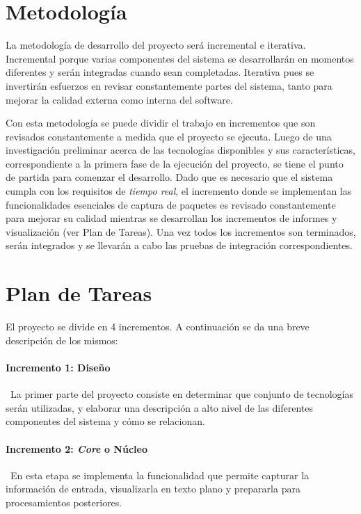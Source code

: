 \section*{Metodología}

La metodología de desarrollo del proyecto será incremental e iterativa. Incremental porque varias componentes del sistema se desarrollarán en momentos diferentes y serán integradas cuando sean completadas. Iterativa pues se invertirán esfuerzos en revisar constantemente partes del sistema, tanto para mejorar la calidad externa como interna del software\cite{ISOIEC9126}.

Con esta metodología se puede dividir el trabajo en incrementos que son revisados constantemente a medida que el proyecto se ejecuta. Luego de una investigación preliminar acerca de las tecnologías disponibles y sus características, correspondiente a la primera fase de la ejecución del proyecto, se tiene el punto de partida para comenzar el desarrollo. Dado que es necesario que el sistema cumpla con los requisitos de \textit{tiempo real}, el incremento donde se implementan las funcionalidades esenciales de captura de paquetes es revisado constantemente para mejorar su calidad mientras se desarrollan los incrementos de informes y visualización (ver Plan de Tareas). Una vez todos los incrementos son terminados, serán integrados y se llevarán a cabo las pruebas de integración correspondientes.

\section*{Plan de Tareas}

El proyecto se divide en 4 incrementos. A continuación se da una breve descripción de los mismos:

\paragraph{Incremento 1: Diseño}\
La primer parte del proyecto consiste en determinar que conjunto de tecnologías serán utilizadas, y elaborar una descripción a alto nivel de las diferentes componentes del sistema y cómo se relacionan.
\paragraph{Incremento 2: \textit{Core} o Núcleo} \
En esta etapa se implementa la funcionalidad que permite capturar la información de entrada, visualizarla en texto plano y prepararla para procesamientos posteriores.
